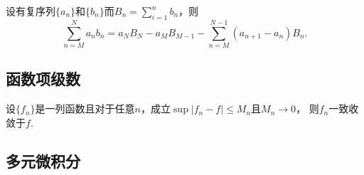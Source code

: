   \begin{thm}[分部求和]
    \label{thm: 分部求和}
    设有复序列$\{a_n\}$和$\{b_n\}$而$B_n=\sum_{i=1}^nb_n$，则
    \[
      \sum_{n=M}^N a_nb_n = a_NB_N - a_MB_{M-1} -
      \sum_{n=M}^{N-1}(a_{n+1}-a_n)B_n.
    \]
  \end{thm}

\subsection{函数项级数}

  \begin{thm}
    设$\{f_n\}$是一列函数且对于任意$n$，成立$\sup|f_n-f|\le M_n$且$M_n\to 0$，
    则$f_n$一致收敛于$f$.
  \end{thm}


\subsection{多元微积分}

